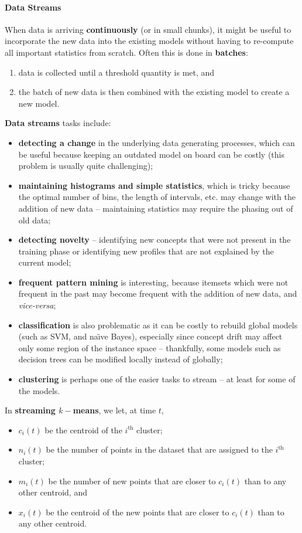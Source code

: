 \paragraph{Data Streams}
When data is arriving \textbf{continuously} (or in small chunks), it might be useful to incorporate the new data into the existing models without having to re-compute all important statistics from scratch. Often this is done in \textbf{batches}:
\begin{enumerate}[noitemsep]
\item data is collected until a threshold quantity is met, and
\item the batch of new data is then combined with the existing model to create a new model.
\end{enumerate}
\textbf{Data streams} tasks include:
\begin{itemize}[noitemsep]
\item \textbf{detecting a change} in the underlying data generating processes, which can be useful because keeping an outdated model on board can be costly (this problem is usually quite challenging);
\item \textbf{maintaining histograms and simple statistics}, which is tricky because the optimal number of bins, the length of intervals, etc. may change with the addition of new data -- maintaining statistics may require the phasing out of old data;
\item \textbf{detecting novelty} -- identifying new concepts that were not present in the training phase or identifying new profiles that are not explained by the current model;
\item \textbf{frequent pattern mining} is interesting, because itemsets which were not frequent in the past may become frequent with the addition of new data, and \textit{vice-versa};
\item \textbf{classification} is also problematic as it can be costly to  rebuild global models (such as SVM, and na\"{\i}ve Bayes), especially since concept drift may affect only some region of the instance space -- thankfully, some models such as decision trees can be modified locally instead of globally; 
\item \textbf{clustering} is perhaps one of the easier tasks to stream -- at least for some of the models.
\end{itemize}
In \textbf{streaming $k-$means}, we let, at time $t$,  
\begin{itemize}[noitemsep]
\item $c_i(t)$ be the centroid of the $i^{\textrm{th}}$ cluster;
\item $n_i(t)$ be the number of points in the dataset that are assigned to the $i^{\textrm{th}}$ cluster;
\item $m_i(t)$ be the number of new points that are closer to $c_i(t)$ than to any other centroid, and \item $x_i(t)$ be the centroid of the new points that  are closer to $c_i(t)$ than to any other centroid.
\end{itemize}
